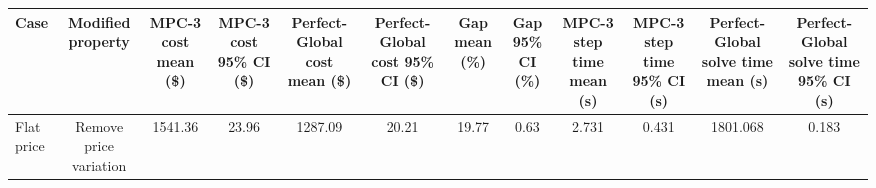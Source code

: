 \begin{tabular}{lccccccccccc}
\toprule
Case & Modified property & MPC-3 cost mean (\$) & MPC-3 cost 95\% CI (\$) & Perfect-Global cost mean (\$) & Perfect-Global cost 95\% CI (\$) & Gap mean (\%) & Gap 95\% CI (\%) & MPC-3 step time mean (s) & MPC-3 step time 95\% CI (s) & Perfect-Global solve time mean (s) & Perfect-Global solve time 95\% CI (s) \\
\midrule
Flat price & Remove price variation & 1541.36 & 23.96 & 1287.09 & 20.21 & 19.77 & 0.63 & 2.731 & 0.431 & 1801.068 & 0.183 \\
\bottomrule
\end{tabular}
